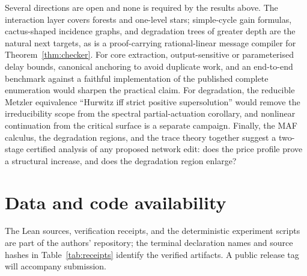 \documentclass[11pt,a4paper]{article}
\theoremstyle{plain}
\theoremstyle{definition}
\theoremstyle{remark}
\begin{document}
Several directions are open and none is required by the results above. The interaction layer covers forests and one-level stars; simple-cycle gain formulas, cactus-shaped incidence graphs, and degradation trees of greater depth are the natural next targets, as is a proof-carrying rational-linear message compiler for Theorem~\ref{thm:checker}. For core extraction, output-sensitive or parameterised delay bounds, canonical anchoring to avoid duplicate work, and an end-to-end benchmark against a faithful implementation of the published complete enumeration would sharpen the practical claim. For degradation, the reducible Metzler equivalence ``Hurwitz iff strict positive supersolution'' would remove the irreducibility scope from the spectral partial-actuation corollary, and nonlinear continuation from the critical surface is a separate campaign. Finally, the MAF calculus, the degradation regions, and the trace theory together suggest a two-stage certified analysis of any proposed network edit: does the price profile prove a structural increase, and does the degradation region enlarge?

\section*{Data and code availability}

The Lean sources, verification receipts, and the deterministic experiment scripts are part of the authors' repository; the terminal declaration names and source hashes in Table~\ref{tab:receipts} identify the verified artifacts. A public release tag will accompany submission.



\end{document}
